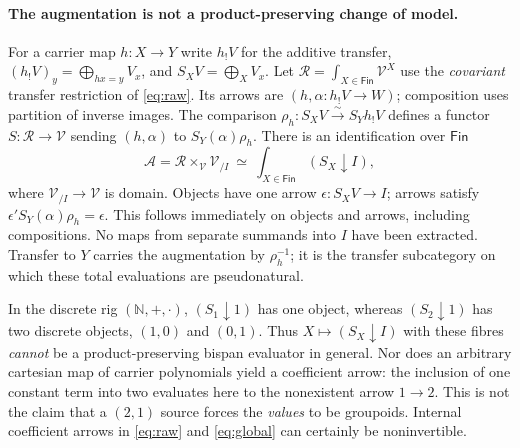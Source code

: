 \documentclass[11pt]{article}
\theoremstyle{definition}
\newcommand{\Fin}{\mathsf{Fin}}
\newcommand{\V}{\mathcal V}
\newcommand{\Acat}{\mathcal A}
\newcommand{\Rcat}{\mathcal R}
\newcommand{\iso}{\xrightarrow{\sim}}
\begin{document}
\paragraph{The augmentation is not a product-preserving change of model.}
For a carrier map $h:X\to Y$ write $h_!V$ for the additive transfer,
$(h_!V)_y=\bigoplus_{hx=y}V_x$, and $S_XV=\bigoplus_X V_x$.
Let $\Rcat=\int_{X\in\Fin} \V^X$ use the \emph{covariant} transfer
restriction of \eqref{eq:raw}. Its arrows are $(h,\alpha:h_!V\to W)$;
composition uses partition of inverse images. The comparison
$\rho_h:S_X V\iso S_Y h_!V$ defines a functor
$S:\Rcat\to\V$ sending $(h,\alpha)$ to $S_Y(\alpha)\rho_h$. There is an
identification over $\Fin$
\begin{equation}
 \Acat=\Rcat\times_{\V}\V_{/I}
      \ \simeq\ \int_{X\in\Fin}(S_X\downarrow I),
 \label{eq:global}
\end{equation}
where $\V_{/I}\to\V$ is domain. Objects have one arrow
$\epsilon:S_XV\to I$; arrows satisfy
$\epsilon'S_Y(\alpha)\rho_h=\epsilon$. This follows immediately on
objects and arrows, including compositions. No maps from separate
summands into $I$ have been extracted. Transfer to $Y$ carries the
augmentation by $\rho_h^{-1}$; it is the transfer subcategory on
which these total evaluations are pseudonatural.

In the discrete rig $(\mathbb N,+,\cdot)$, $(S_1\downarrow1)$ has one
object, whereas $(S_2\downarrow1)$ has two discrete objects, $(1,0)$
and $(0,1)$. Thus $X\mapsto(S_X\downarrow I)$ with these fibres
\emph{cannot} be a product-preserving bispan evaluator in general.
Nor does an arbitrary cartesian map of carrier polynomials yield a
coefficient arrow: the inclusion of one constant term into two
evaluates here to the nonexistent arrow $1\to2$. This is not the
claim that a $(2,1)$ source forces the \emph{values} to be groupoids.
Internal coefficient arrows in \eqref{eq:raw} and \eqref{eq:global}
can certainly be noninvertible.
\end{document}
